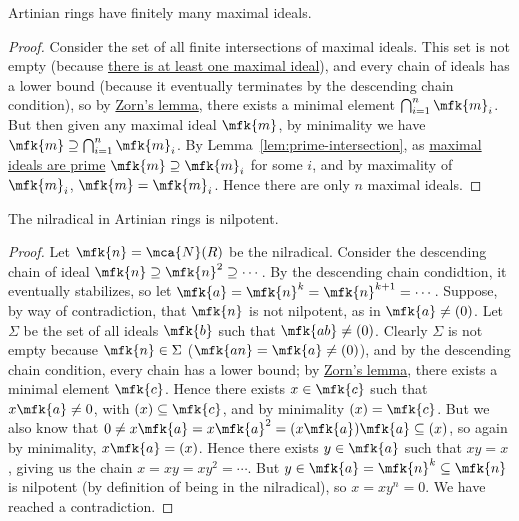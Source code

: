 \begin{proposition}
    Artinian rings have finitely many maximal ideals.
\end{proposition}
\begin{proof}
    Consider the set of all finite intersections of maximal ideals.
    This set is not empty (because \hyperref[thm:krull]{there is at least one maximal ideal}),
    and every chain of ideals has a lower bound (because it eventually terminates by the descending chain condition),
    so by \hyperref[ax:zorn]{Zorn's lemma},
    there exists a minimal element \(\bigcap_{i=1}^n \mfk{m}_i\).
    But then given any maximal ideal \(\mfk{m}\),
    by minimality we have \(\mfk{m} \supseteq \bigcap_{i=1}^n \mfk{m}_i\).
    By Lemma~\ref{lem:prime-intersection}, as \hyperref[thm:maximal-prime-radical]{maximal ideals are prime}
    \(\mfk{m} \supseteq \mfk{m}_i\) for some \(i\),
    and by maximality of \(\mfk{m}_i\), \(\mfk{m} = \mfk{m}_i\).
    Hence there are only \(n\) maximal ideals.
\end{proof}
\begin{proposition}
    The nilradical in Artinian rings is nilpotent.
\end{proposition}
\begin{proof}
    Let \(\mfk{n} = \mca{N}(R)\) be the nilradical.
    Consider the descending chain of ideal \(\mfk{n} \supseteq \mfk{n}^2 \supseteq \cdots\).
    By the descending chain condidtion, it eventually stabilizes,
    so let \(\mfk{a} = \mfk{n}^k = \mfk{n}^{k+1} = \cdots\).
    Suppose, by way of contradiction, that \(\mfk{n}\) is not nilpotent, as in \(\mfk{a} \neq (0)\).
    Let \(\Sigma\) be the set of all ideals \(\mfk{b}\) such that \(\mfk{ab} \neq (0)\).
    Clearly \(\Sigma\) is not empty because \(\mfk{n} \in \Sigma\) (\(\mfk{an} = \mfk{a} \neq (0)\)),
    and by the descending chain condition, every chain has a lower bound;
    by \hyperref[ax:zorn]{Zorn's lemma}, there exists a minimal element \(\mfk{c}\).
    Hence there exists \(x \in \mfk{c}\) such that \(x\mfk{a} \neq 0\),
    with \((x) \subseteq \mfk{c}\), and by minimality \((x) = \mfk{c}\).
    But we also know that \(0 \neq x\mfk{a} = x\mfk{a}^2 = (x\mfk{a})\mfk{a} \subseteq (x)\),
    so again by minimality, \(x\mfk{a} = (x)\).
    Hence there exists \(y \in \mfk{a}\) such that \(xy = x\), giving us the chain \(x = xy = xy^2 = \cdots\).
    But \(y \in \mfk{a} = \mfk{n}^k \subseteq \mfk{n}\) is nilpotent (by definition of being in the nilradical),
    so \(x = xy^n = 0\).
    We have reached a contradiction.
\end{proof}

